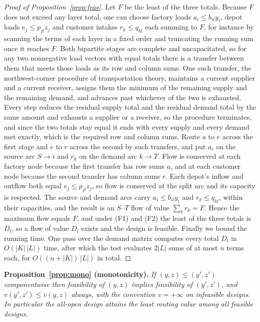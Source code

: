 \begin{proof}[Proof of Proposition~\ref{prop:feas}]
Let $F$ be the least of the three totals.
Because $F$ does not exceed any layer total, one can choose factory loads
$a_i\le b_{il}y_i$, depot loads $e_j\le p_{jl}z_j$ and customer intakes
$r_k\le q_{kl}$ each summing to $F$, for instance by scanning the terms
of each layer in a fixed order and truncating the running sum once it
reaches $F$. Both bipartite stages are complete and uncapacitated, so for
any two nonnegative load vectors with equal totals there is a transfer
between them that meets those loads as its row and column sums. One such
transfer, the northwest-corner procedure of transportation theory,
maintains a current supplier and a current receiver, assigns
them the minimum of the remaining supply and the remaining demand, and
advances past whichever of the two is exhausted. Every step reduces the
residual supply total and the residual demand total by the same amount
and exhausts a supplier or a receiver, so the procedure terminates, and
since the two totals stay equal it ends with every supply and every
demand met exactly, which is the required row and column sums. Route $a$
to $e$ across the first stage and $e$ to $r$ across the second by such
transfers, and put $a_i$ on the source arc $S\!\to\! i$ and $r_k$ on the
demand arc $k\!\to\! T$. Flow is conserved at each factory node because
the first transfer has row sums $a$, and at each customer node because
the second transfer has column sums $r$. Each depot's inflow and outflow
both equal $e_j\le p_{jl}z_j$, so flow is conserved at the split arc and
its capacity is respected. The source and demand arcs carry
$a_i\le b_{il}y_i$ and $r_k\le q_{kl}$, within their capacities, and the
result is an $S$--$T$ flow of value $\sum_k r_k=F$. Hence the maximum
flow equals $F$, and under (F1) and (F2) the least of the three totals is
$D_l$, so a flow of value $D_l$ exists and the design is feasible.
Finally we bound the running time. One pass over the demand matrix
computes every total $D_l$ in $O(|K|\,|L|)$ time, after which the test
evaluates $2|L|$ sums of at most $n$ terms each, for $O((n+|K|)\,|L|)$
in total.
\end{proof}

\medskip\noindent
\textbf{Proposition~\ref{prop:mono} (monotonicity).}
\emph{If $(y,z)\le(y',z')$ componentwise then feasibility of $(y,z)$
implies feasibility of $(y',z')$, and $v(y',z')\le v(y,z)$ always, with
the convention $v=+\infty$ on infeasible designs. In particular the
all-open design attains the least routing value among all feasible
designs.}

